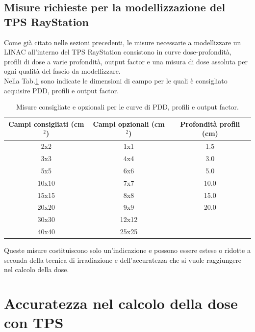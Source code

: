 \subsection{Misure richieste per la modellizzazione del TPS RayStation}
Come già citato nelle sezioni precedenti, le misure necessarie a modellizzare un LINAC all'interno del TPS RayStation consistono in curve dose-profondità, profili di dose a varie profondità, output factor e una misura di dose assoluta per ogni qualità del fascio da modellizzare.\\
Nella Tab.\ref{tab:meas} sono indicate le dimensioni di campo per le quali è consigliato acquisire PDD, profili e  output factor.
\begin{table}
\begin{tabular}{@{}ccc@{}}
\toprule
Campi consigliati (cm$^2$) & Campi opzionali (cm$^2$) & Profondità profili (cm)\\
\midrule
2x2 & 1x1 & 1.5\\
3x3 & 4x4 & 3.0\\
5x5 & 6x6 & 5.0\\
10x10 & 7x7 & 10.0\\
15x15 & 8x8 & 15.0\\
20x20 & 9x9 & 20.0\\
30x30 & 12x12 & \\
40x40 & 25x25 & \\
\bottomrule
\end{tabular}
\caption{Misure consigliate e opzionali per le curve di PDD, profili e output factor.}
\label{tab:meas}
\end{table}
Queste misure costituiscono solo un'indicazione e possono essere estese o ridotte a seconda della tecnica di irradiazione e dell'accuratezza che si vuole raggiungere nel calcolo della dose.

\section{Accuratezza nel calcolo della dose con TPS}
